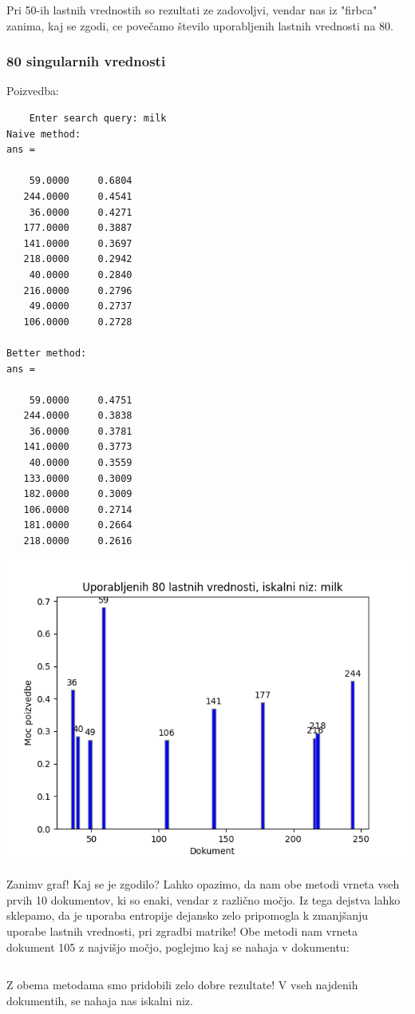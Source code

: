 \documentclass{article}
\begin{document}
Pri 50-ih lastnih vrednostih so rezultati ze zadovoljvi, vendar nas iz "firbca" zanima, kaj se zgodi, ce povečamo število uporabljenih lastnih vrednosti na 80.

\subsubsection{80 singularnih vrednosti}

Poizvedba:
\begin{small}
\begin{verbatim}
    Enter search query: milk
Naive method:
ans =

    59.0000     0.6804
   244.0000     0.4541
    36.0000     0.4271
   177.0000     0.3887
   141.0000     0.3697
   218.0000     0.2942
    40.0000     0.2840
   216.0000     0.2796
    49.0000     0.2737
   106.0000     0.2728

Better method:
ans =

    59.0000     0.4751
   244.0000     0.3838
    36.0000     0.3781
   141.0000     0.3773
    40.0000     0.3559
   133.0000     0.3009
   182.0000     0.3009
   106.0000     0.2714
   181.0000     0.2664
   218.0000     0.2616
\end{verbatim}
\end{small}

\begin{center}
    \includegraphics[scale=0.65]{../graphs/generated_graphs/graph_80_singular_values_used.png}   
\end{center}

Zanimv graf! Kaj se je zgodilo? Lahko opazimo, da nam obe metodi vrneta vseh prvih 10 dokumentov, ki so enaki, vendar z različno močjo. Iz tega dejstva lahko sklepamo, da je uporaba entropije dejansko
zelo pripomogla k zmanjšanju uporabe lastnih vrednosti, pri zgradbi matrike! 
Obe metodi nam vrneta dokument 105 z najvišjo močjo, poglejmo kaj se nahaja v dokumentu:
\begin{verbatim}

\end{verbatim}
Z obema metodama smo pridobili zelo dobre rezultate! V vseh najdenih dokumentih, se nahaja nas iskalni niz.
\newpage
\end{document}
